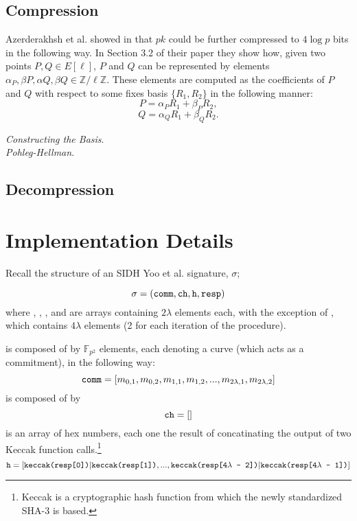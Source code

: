 \subsection{Compression}

Azerderakhsh et al. showed in \cite{compwr} that $pk$ could be further compressed to $4\log p$ bits in the following way. In Section 3.2 of their paper they show how, given two points $P, Q \in E[\ell]$, $P$ and $Q$ can be represented by elements $\alpha_{P}, \beta{P}, \alpha{Q}, \beta{Q} \in \mathbb{Z}/\ell\mathbb{Z}$. These elements are computed as the coefficients of $P$ and $Q$ with respect to some fixes basis $\{R_1, R_2\}$ in the following manner: 
$$
P = \alpha_{P}R_1 + \beta_{P}R_2,
$$
$$
Q = \alpha_{Q}R_1 + \beta_{Q}R_2.
$$

\noindent
\textit{Constructing the Basis}.\\

\noindent
\textit{Pohleg-Hellman}.

\subsection{Decompression}

\section{Implementation Details}
\label{sec:compimplementation}

Recall the structure of an SIDH Yoo et al. signature, $\sigma$;

$$
\sigma = (\texttt{comm}, \texttt{ch}, \texttt{h}, \texttt{resp})
$$
where , , , and  are arrays containing $2\lambda$ elements each, with the exception of , which contains $4\lambda$ elements (2 for each iteration of the procedure).

 is composed of by $\mathbb{F}_{p^2}$ elements, each denoting a curve (which acts as a commitment), in the following way:
$$
\texttt{comm} = [m_{0, 1}, m_{0, 2}, m_{1, 1}, m_{1, 2}, ... , m_{2\lambda, 1}, m_{2\lambda, 2}]
$$
 is composed of by
$$
\texttt{ch} = []
$$
 is an array of hex numbers, each one the result of concatinating the output of two Keccak function calls.\footnote{Keccak is a cryptographic hash function from which the newly standardized SHA-3 is based.} 
$$
\texttt{h} = [\texttt{keccak(resp[0])}|\texttt{keccak(resp[1])}, ... , \texttt{keccak(resp[4}\lambda\texttt{ - 2])}|\texttt{keccak(resp[4}\lambda\texttt{ - 1])}]
$$

